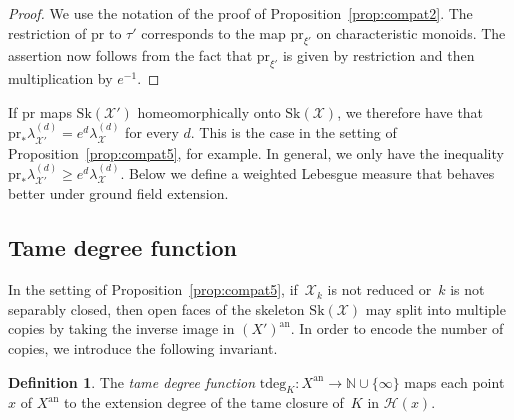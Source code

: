 \documentclass[11pt]{article}
\theoremstyle{definition}
\newtheorem{definition}[equation]{Definition}
\numberwithin{equation}{subsection}
\newcommand{\N}{\ensuremath{\mathbb{N}}}
\newcommand{\cX}{\ensuremath{\mathscr{X}}}
\newcommand{\an}{\mathrm{an}}
\newcommand{\pr}{\mathrm{pr}}
\newcommand{\Sk}{\mathrm{Sk}}
\newcommand{\tdeg}{\mathrm{tdeg}}
\let\Leb\lambda
\begin{document}
\begin{proof} We use the notation of the proof of Proposition~\ref{prop:compat2}. The restriction of $\pr$ to $\tau'$ corresponds to the map $\pr_{\xi'}$ on characteristic monoids. The assertion now follows from the fact that $\pr_{\xi'}$ is given by restriction and then multiplication by $e^{-1}$.
\end{proof}
If $\pr$ maps $\Sk(\cX')$ homeomorphically onto $\Sk(\cX)$, we therefore have
that $\pr_*\Leb^{(d)}_{\cX'}=e^d\Leb^{(d)}_\cX$ for every $d$. This is the case
in the setting of Proposition~\ref{prop:compat5}, for example.
In general, we only have the inequality $\pr_*\Leb^{(d)}_{\cX'}\ge e^d\Leb^{(d)}_\cX$. Below we define a weighted Lebesgue measure that behaves better under ground field extension.

\subsection{Tame degree function}\label{ss:tamedeg}
In the setting of Proposition~\ref{prop:compat5}, if~$\cX_k$ is not reduced or~$k$ is not separably closed, then open faces of the skeleton $\Sk(\cX)$ may split into multiple copies by taking the inverse image
in $(X')^{\an}$. In order to encode the number of copies, we introduce the following invariant.
\begin{definition}
The \emph{tame degree function} $\tdeg_K\colon X^{\an}\to \N\cup \{\infty\}$ maps each point~$x$ of $X^{\an}$ to the extension degree of the tame closure of~$K$ in $\mathscr{H}(x)$.
\end{definition}
\end{document}
